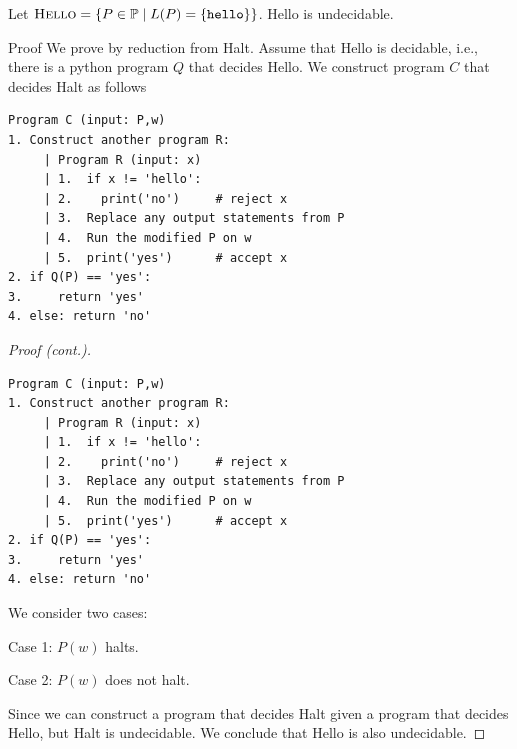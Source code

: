 \begin{frame}[fragile=true]
  \begin{lemma}
    Let $\textsc{Hello} = \{ P\in{\mathbb P} \;|\;
    L(P)=\{\texttt{hello}\}\}$.
    {\sc Hello} is undecidable.
  \end{lemma}
  \begin{block}{Proof}
      We prove by reduction from {\sc Halt}.  Assume that {\sc Hello}
      is decidable, i.e., there is a python program $Q$ that decides
      {\sc Hello}.  We construct program $C$ that decides {\sc Halt}
      as follows

      {\footnotesize
\begin{verbatim}
Program C (input: P,w)
1. Construct another program R:
     | Program R (input: x)
     | 1.  if x != 'hello':
     | 2.    print('no')     # reject x
     | 3.  Replace any output statements from P
     | 4.  Run the modified P on w 
     | 5.  print('yes')      # accept x
2. if Q(P) == 'yes':
3.     return 'yes'
4. else: return 'no'
\end{verbatim}
      }
  \end{block}
\end{frame}


\begin{frame}[fragile=true]
  \begin{proof}[Proof (cont.)]
    {\tiny
\begin{verbatim}
Program C (input: P,w)
1. Construct another program R:
     | Program R (input: x)
     | 1.  if x != 'hello':
     | 2.    print('no')     # reject x
     | 3.  Replace any output statements from P
     | 4.  Run the modified P on w 
     | 5.  print('yes')      # accept x
2. if Q(P) == 'yes':
3.     return 'yes'
4. else: return 'no'
\end{verbatim}
    }
    {\small
      We consider two cases:

      Case 1: $P(w)$ halts. \pause

      Case 2: $P(w)$ does not halt. \pause

      Since we can construct a program that decides {\sc Halt} given a
      program that decides {\sc Hello}, but {\sc Halt} is undecidable.
      We conclude that {\sc Hello} is also undecidable.
    }
  \end{proof}
\end{frame}


